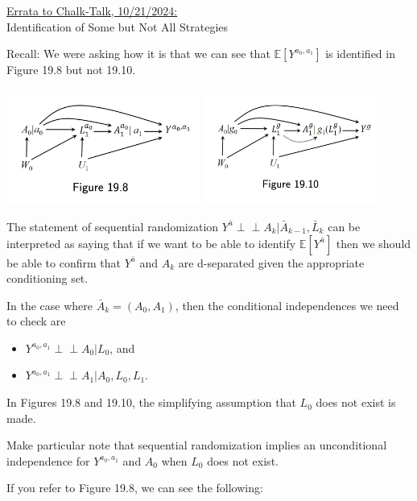 \documentclass[11pt]{article}
\newcommand{\independent}[0]{\perp\!\!\!\perp}
\begin{document}
\begin{center}\ul{Errata to Chalk-Talk, 10/21/2024:} \\
Identification of Some but Not All Strategies 
\end{center}
\vspace{.25in}

Recall:  We were asking how it is that we can see that $\mathbb E[Y^{a_0,
a_1}]$ is identified in Figure 19.8 but not 19.10.

\includegraphics[width=2.5in]{fig198.png}
\includegraphics[width=2.25in]{fig1910.png}

The statement of sequential randomization $Y^{\bar{a}} \independent A_k | \bar{A}_{k-1}, \bar{L}_{k}$ can be 
interpreted as saying that if we want to be able to identify $\mathbb E[Y^{\bar{a}}]$ 
then we should be able to confirm that $Y^{\bar{a}}$ and $A_k$ are d-separated
given the appropriate conditioning set. 

In the case where $\bar{A}_k = (A_0, A_1)$, then the conditional independences we need to check 
are 
\begin{itemize}
\item $Y^{a_0, a_1} \independent A_0 | L_0$, and 
\item $Y^{a_0, a_1} \independent A_1 | A_0, L_0, L_1.$ 
\end{itemize}

In Figures 19.8 and 19.10, the simplifying assumption that $L_0$ does not exist is made. 

Make particular note that sequential randomization implies an unconditional independence for 
$Y^{a_0, a_1}$ and $A_0$ when $L_0$ does not exist. 

If you refer to Figure 19.8, we can see the following: 
\end{document}
